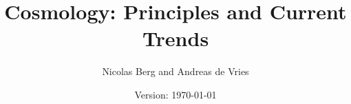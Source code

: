 \documentclass[12pt,twoside]{report}
\newcommand{\autor}{Nicolas Berg and Andreas de Vries}
\newcommand{\titel}{Cosmology: Principles and Current Trends}
\theoremstyle{definition}
\begin{document}
\author{\autor}
\title{\textbf{\titel}}
\date{%
	Version: \today
}

\maketitle
\tableofcontents






\appendix
{}





\printbibliography[heading=bibintoc]


\begin{footnotesize}
\printindex
\end{footnotesize}
\end{document}
